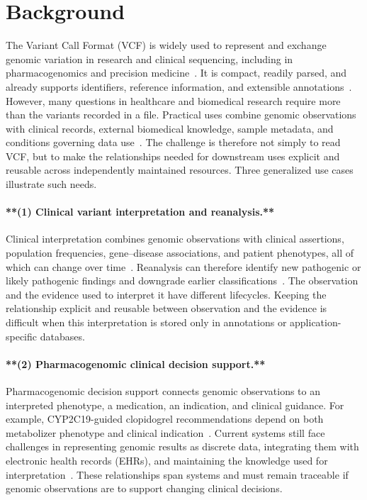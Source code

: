 \documentclass[pdflatex,sn-mathphys-num]{sn-jnl}
\begin{document}
\section{Background}\label{sec:background}
The Variant Call Format (VCF) is widely used to represent and exchange genomic variation in research and clinical sequencing, including in pharmacogenomics and precision medicine~\cite{vcf_spec_2024,pharmcat,souche_recommendations_2022}.
It is compact, readily parsed, and already supports identifiers, reference information, and extensible annotations~\cite{vcf_spec_2024,BCFtools}.
However, many questions in healthcare and biomedical research require more than the variants recorded in a file.
Practical uses combine genomic observations with clinical records, external biomedical knowledge, sample metadata, and conditions governing data use~\cite{gottesman2013emerge,allofus2024genomic,rehm2021ga4gh}.
The challenge is therefore not simply to read VCF, but to make the relationships needed for downstream uses explicit and reusable across independently maintained resources.
Three generalized use cases illustrate such needs.

\paragraph{**(1) Clinical variant interpretation and reanalysis.**}\label{uc:reanalysis}
Clinical interpretation combines genomic observations with clinical assertions, population frequencies, gene--disease associations, and patient phenotypes, all of which can change over time~\cite{richards2015standards,deignan2019reevaluation}.
Reanalysis can therefore identify new pathogenic or likely pathogenic findings and downgrade earlier classifications~\cite{hiatt2018systematic}.
The observation and the evidence used to interpret it have different lifecycles.
Keeping the relationship explicit and reusable between observation and the evidence is difficult when this interpretation is stored only in annotations or application-specific databases.

\paragraph{**(2) Pharmacogenomic clinical decision support.**}\label{uc:pgx}
Pharmacogenomic decision support connects genomic observations to an interpreted phenotype, a medication, an indication, and clinical guidance.
For example, CYP2C19-guided clopidogrel recommendations depend on both metabolizer phenotype and clinical indication~\cite{lee2022clopidogrel}.
Current systems still face challenges in representing genomic results as discrete data, integrating them with electronic health records (EHRs), and maintaining the knowledge used for interpretation~\cite{wake2022pgx,johnson2024genetically}.
These relationships span systems and must remain traceable if genomic observations are to support changing clinical decisions.
\end{document}
